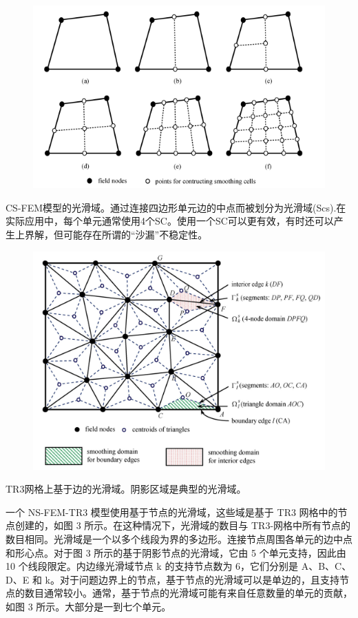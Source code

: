 \documentclass[12pt,a4paper]{article}
\begin{document}
\begin{figure}[H]
\centering
\includegraphics[scale=0.5]{./figures/1.png}
\caption{}
\end{figure}

CS-FEM模型的光滑域。通过连接四边形单元边的中点而被划分为光滑域(Scs).在实际应用中，每个单元通常使用4个SC。使用一个SC可以更有效，有时还可以产生上界解，但可能存在所谓的“沙漏”不稳定性。

\begin{figure}[H]
\centering
\includegraphics[scale=0.5]{./figures/2.png}
\caption{}
\end{figure}

TR3网格上基于边的光滑域。阴影区域是典型的光滑域。

一个 NS-FEM-TR3 模型使用基于节点的光滑域，这些域是基于 TR3 网格中的节点创建的，如图 3 所示。在这种情况下，光滑域的数目与 TR3-网格中所有节点的数目相同。光滑域是一个以多个线段为界的多边形。连接节点周围各单元的边中点和形心点。对于图 3 所示的基于阴影节点的光滑域，它由 5 个单元支持，因此由 10 个线段限定。内边缘光滑域节点 k 的支持节点数为 6，它们分别是 A、B、C、D、E 和 k。对于问题边界上的节点，基于节点的光滑域可以是单边的，且支持节点的数目通常较小。通常，基于节点的光滑域可能有来自任意数量的单元的贡献，如图 3 所示。大部分是一到七个单元。
\end{document}
